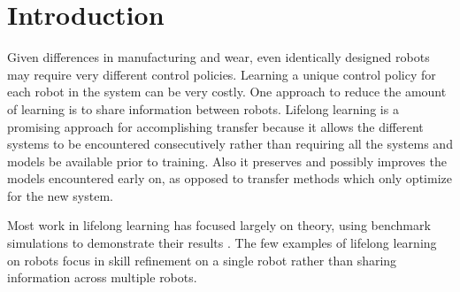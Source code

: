 \documentclass{aamas2016}
\begin{document}



\section{Introduction}

Given differences in manufacturing and wear, even identically designed robots may require very different control policies. Learning a unique control policy for each robot in the system can be very costly. One approach to reduce the amount of learning is to share information between robots. Lifelong learning \cite{Ruvolo2013} is a promising approach for accomplishing transfer because it allows the different systems to be encountered consecutively rather than requiring all the systems and models be available prior to training. Also it preserves and possibly improves the models encountered early on, as opposed to transfer methods which only optimize for the new system.


Most work in lifelong learning has focused largely on theory, using benchmark simulations to demonstrate their results \cite{Ruvolo2013,BouAmmar2014a,bouAmmar2015unsupervised}. The few examples of lifelong learning on robots focus in skill refinement on a single robot \cite{thrun1995lifelong} \cite{kleiner2002towards} rather than sharing information across multiple robots. 
\end{document}
